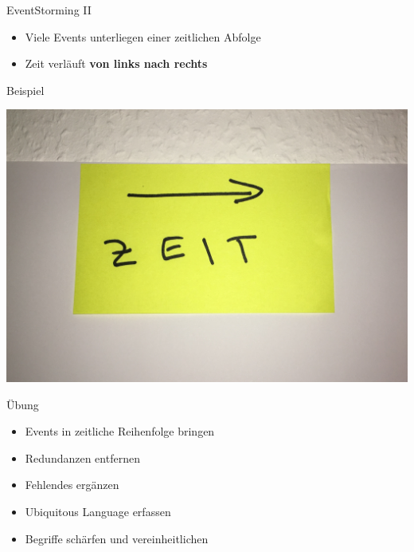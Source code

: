 \begin{frame}[fragile]{EventStorming II}

\begin{itemize}
\item Viele Events unterliegen einer zeitlichen Abfolge
\item Zeit verläuft \textbf{von links nach rechts}
\end{itemize}

\end{frame}

\begin{frame}[fragile]{Beispiel}

\begin{center}
\includegraphics[width=.5\textwidth]{pics/eventstorming_zeit.jpg}
\end{center}

\end{frame}


\begin{frame}[fragile]{Übung}

\begin{itemize}

\item Events in zeitliche Reihenfolge bringen

\item Redundanzen entfernen

\item Fehlendes ergänzen

\item Ubiquitous Language erfassen

\item Begriffe schärfen und vereinheitlichen

\end{itemize}

\end{frame}

